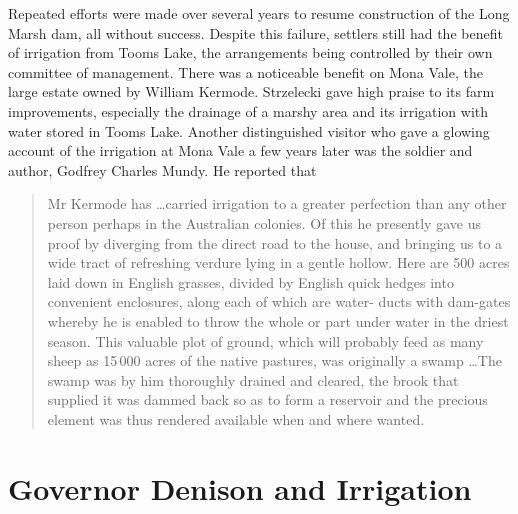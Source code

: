 Repeated efforts were made over several years to resume construction
of the Long Marsh dam, all without success.  Despite this failure, settlers still had the benefit of
irrigation from Tooms Lake, the arrangements being controlled by their
own committee of management.  There was a noticeable benefit on Mona
Vale, the large estate owned by William Kermode.  Strzelecki gave high
praise to its farm improvements, especially the drainage of a marshy
area and its irrigation with water stored in Tooms
Lake.  Another
distinguished visitor who gave a glowing account of the irrigation at
Mona Vale a few years later was the soldier and author, Godfrey
Charles Mundy. He reported that
\begin{quote}
	Mr Kermode has \ldots carried irrigation to a greater
	perfection than any other person perhaps in the Australian
	colonies.  Of this he presently gave us proof by diverging
	from the direct road to the house, and bringing us to a wide
	tract of refreshing verdure lying in a gentle hollow.  Here
	are 500 acres laid down in English grasses, divided by English
	quick hedges into convenient enclosures, along each of which
	are water- ducts with dam-gates whereby he is enabled to throw
	the whole or part under water in the driest season. This
	valuable plot of ground, which will probably feed as many
	sheep as 15\,000 acres of the native pastures, was originally a
	swamp \ldots The swamp was by him thoroughly drained and
	cleared, the brook that supplied it was dammed back so as to
	form a reservoir and the precious element was thus rendered
	available when and where wanted.
\end{quote}

\section*{Governor Denison and Irrigation}


